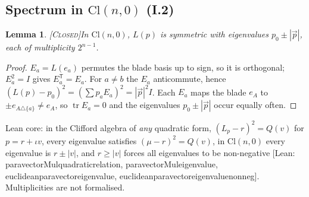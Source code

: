 \documentclass[11pt]{amsart}
\theoremstyle{plain}
\newtheorem{lemma}[theorem]{Lemma}
\theoremstyle{definition}
\newcommand{\Cl}{\mathrm{Cl}}
\newcommand{\tr}{\operatorname{tr}}
\newcommand{\status}[1]{\textsc{[#1]}}
\newcommand{\leanus}{\textunderscore\allowbreak}
\newcommand{\lean}[1]{{\ttfamily\let\_\leanus #1}}
\begin{document}
\subsection{Spectrum in $\Cl(n,0)$ (I.2)}
\begin{lemma}\status{Closed}\label{lem:I2}
In $\Cl(n,0)$, $L(p)$ is symmetric with eigenvalues $p_0\pm|\vec p|$, each of
multiplicity $2^{n-1}$.
\end{lemma}
\begin{proof}
$E_a=L(e_a)$ permutes the blade basis up to sign, so it is orthogonal; $E_a^2=I$
gives $E_a^{\mathsf T}=E_a$. For $a\neq b$ the $E_a$ anticommute, hence
$(L(p)-p_0)^2=(\sum p_aE_a)^2=|\vec p|^2 I$. Each $E_a$ maps the blade $e_A$ to
$\pm e_{A\triangle\{a\}}\neq e_A$, so $\tr E_a=0$ and the eigenvalues
$p_0\pm|\vec p|$ occur equally often.
\end{proof}
\noindent Lean core: in the Clifford algebra of \emph{any} quadratic form,
$(L_p-r)^2=Q(v)$ for $p=r+\iota v$, every eigenvalue satisfies $(\mu-r)^2=Q(v)$,
in $\Cl(n,0)$ every eigenvalue is $r\pm|v|$, and $r\ge|v|$ forces all eigenvalues
to be non-negative
\lean{[Lean: paravectorMul\_quadratic\_relation, paravectorMul\_eigenvalue,
euclidean\_paravector\_eigenvalue, euclidean\_paravector\_eigenvalue\_nonneg]}.
Multiplicities are not formalised.
\end{document}
